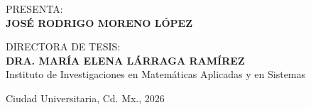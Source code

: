 \begin{titlepage}
{\normalsize PRESENTA:}\\[0.30cm]
{\large\bfseries JOSÉ RODRIGO MORENO LÓPEZ}


{\normalsize DIRECTORA DE TESIS:}\\[0.30cm]
{\large\bfseries DRA. MARÍA ELENA LÁRRAGA RAMÍREZ}\\[0.20cm]
{\normalsize Instituto de Investigaciones en Matemáticas Aplicadas y en Sistemas}


{\normalsize Ciudad Universitaria, Cd. Mx., 2026}
\end{titlepage}
\cleardoublepage
